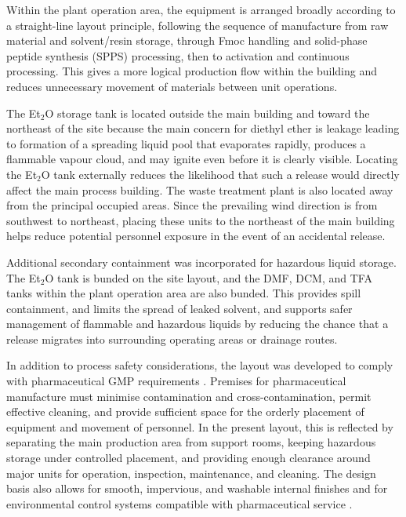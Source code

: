 Within the plant operation area, the equipment is arranged broadly according to a straight-line layout principle, following the sequence of manufacture from raw material and solvent/resin storage, through Fmoc handling and solid-phase peptide synthesis (SPPS) processing, then to activation and continuous processing. This gives a more logical production flow within the building and reduces unnecessary movement of materials between unit operations.

The Et$_2$O storage tank is located outside the main building and toward the northeast of the site because the main concern for diethyl ether is leakage leading to formation of a spreading liquid pool that evaporates rapidly, produces a flammable vapour cloud, and may ignite even before it is clearly visible. Locating the Et$_2$O tank externally reduces the likelihood that such a release would directly affect the main process building. The waste treatment plant is also located away from the principal occupied areas. Since the prevailing wind direction is from southwest to northeast, placing these units to the northeast of the main building helps reduce potential personnel exposure in the event of an accidental release.

Additional secondary containment was incorporated for hazardous liquid storage. The Et$_2$O tank is bunded on the site layout, and the DMF, DCM, and TFA tanks within the plant operation area are also bunded. This provides spill containment, and limits the spread of leaked solvent, and supports safer management of flammable and hazardous liquids by reducing the chance that a release migrates into surrounding operating areas or drainage routes.

In addition to process safety considerations, the layout was developed to comply with pharmaceutical GMP requirements \cite{EMA_GMP, GMP_Premises}. Premises for pharmaceutical manufacture must minimise contamination and cross-contamination, permit effective cleaning, and provide sufficient space for the orderly placement of equipment and movement of personnel. In the present layout, this is reflected by separating the main production area from support rooms, keeping hazardous storage under controlled placement, and providing enough clearance around major units for operation, inspection, maintenance, and cleaning. The design basis also allows for smooth, impervious, and washable internal finishes and for environmental control systems compatible with pharmaceutical service \cite{EC_Annex1_PDF_2022}.

